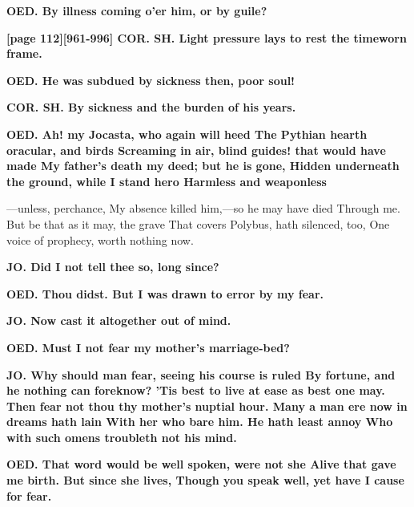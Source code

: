 \documentclass[11pt,letter]{book}
\begin{document}
\par \textbf{OED. By illness coming o’er him, or by guile?}
\par 

\par \textbf{[page 112][961-996] COR. SH. Light pressure lays to rest the timeworn frame.}
\par 

\par \textbf{OED. He was subdued by sickness then, poor soul!}
\par 

\par \textbf{COR. SH. By sickness and the burden of his years.}
\par 

\par \textbf{OED. Ah! my Jocasta, who again will heed The Pythian hearth oracular, and birds Screaming in air, blind guides! that would have made My father’s death my deed; but he is gone, Hidden underneath the ground, while I stand hero Harmless and weaponless}
\par  —unless, perchance, My absence killed him,—so he may have died Through me. But be that as it may, the grave That covers Polybus, hath silenced, too, One voice of prophecy, worth nothing now.

\par \textbf{JO. Did I not tell thee so, long since?}
\par 

\par \textbf{OED. Thou didst. But I was drawn to error by my fear.}
\par 

\par \textbf{JO. Now cast it altogether out of mind.}
\par 

\par \textbf{OED. Must I not fear my mother’s marriage-bed?}
\par 

\par \textbf{JO. Why should man fear, seeing his course is ruled By fortune, and he nothing can foreknow? ’Tis best to live at ease as best one may. Then fear not thou thy mother’s nuptial hour. Many a man ere now in dreams hath lain With her who bare him. He hath least annoy Who with such omens troubleth not his mind.}
\par 

\par \textbf{OED. That word would be well spoken, were not she Alive that gave me birth. But since she lives, Though you speak well, yet have I cause for fear.}
\par 
\end{document}

